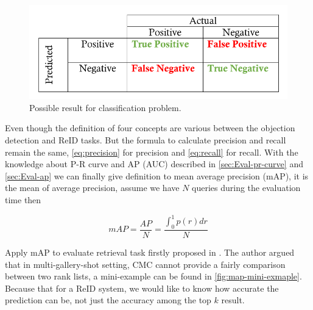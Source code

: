 \begin{figure}
    \centering
    \includegraphics[scale=0.4]{figures/eval_classif_metric.png}
    \caption{Possible result for classification problem.}
    \label{fig:eval-classif-metric}
\end{figure}

Even though the definition of four concepts are various between the objection detection
and ReID tasks. But the formula to calculate precision and recall remain the
same, \autoref{eq:precision} for precision and \autoref{eq:recall} for recall.
With the knowledge about P-R curve and AP (AUC) described in
\autoref{sec:Eval-pr-curve} and \autoref{sec:Eval-ap} we can finally give
definition to mean average precision (mAP), it is the mean of average
precision, assume we have $N$ queries during the evaluation time then

\begin{equation}
\label{eq:map}
\mathit{mAP} = \frac{\mathit{AP}}{N} = \dfrac{\int_0^1p(r)dr}{N}
\end{equation}

Apply mAP to evaluate retrieval task firstly proposed in
\cite{dataset-market1501-2015}. The author argued that in multi-gallery-shot
setting, CMC cannot provide a fairly comparison between two rank lists, a
mini-example can be found in \autoref{fig:map-mini-exmaple}. Because that for a ReID
system, we would like to know how accurate the prediction can be, not just the
accuracy among the top $k$ result.

